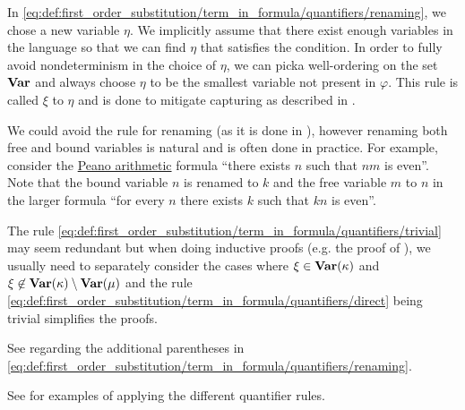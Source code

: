\begin{definition}
\begin{thmenum}
    In \eqref{eq:def:first_order_substitution/term_in_formula/quantifiers/renaming}, we chose a new variable \( \eta \). We implicitly assume that there exist enough variables in the language so that we can find \( \eta \) that satisfies the condition. In order to fully avoid nondeterminism in the choice of \( \eta \), we can pick\AOC a well-ordering on the set \( \operatorname{\mathbf{Var}} \) and always choose \( \eta \) to be the smallest variable not present in \( \varphi \). This rule is called  \( \xi \) to \( \eta \) and is done to mitigate capturing as described in .

    We could avoid the rule for renaming (as it is done in \cite[def. 15.25]{OpenLogicFull}), however renaming both free and bound variables is natural and is often done in practice. For example, consider the \hyperref[def:peano_arithmetic]{Peano arithmetic} formula \enquote{there exists \( n \) such that \( nm \) is even}. Note that the bound variable \( n \) is renamed to \( k \) and the free variable \( m \) to \( n \) in the larger formula \enquote{for every \( n \) there exists \( k \) such that \( kn \) is even}.

    The rule \eqref{eq:def:first_order_substitution/term_in_formula/quantifiers/trivial} may seem redundant but when doing inductive proofs (e.g. the proof of ), we usually need to separately consider the cases where \( \xi \in \operatorname{\mathbf{Var}}(\kappa) \) and \( \xi \not\in \operatorname{\mathbf{Var}}(\kappa) \setminus \operatorname{\mathbf{Var}}(\mu) \) and the rule \eqref{eq:def:first_order_substitution/term_in_formula/quantifiers/direct} being trivial simplifies the proofs.

    See  regarding the additional parentheses in \eqref{eq:def:first_order_substitution/term_in_formula/quantifiers/renaming}.

    See  for examples of applying the different quantifier rules.
  \end{thmenum}
\end{definition}

